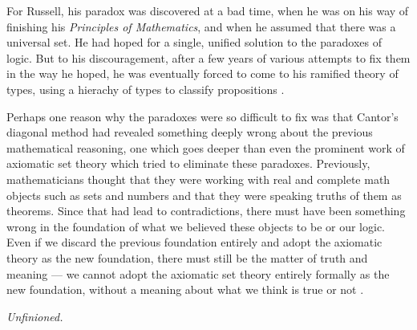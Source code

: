 \documentclass[10pt]{article}
\begin{document}
For Russell, his paradox was discovered at a bad time, when he was on his way
of finishing his \emph{Principles of Mathematics}, and when he assumed that
there was a universal set. He had hoped for a single, unified solution to the
paradoxes of logic. But to his discouragement, after a few years of various
attempts to fix them in the way he hoped, he was eventually forced to come to
his ramified theory of types, using a hierachy of types to classify
propositions \cite{companion.to.russell.tt}.

Perhaps one reason why the paradoxes were so difficult to fix was that Cantor's
diagonal method had revealed something deeply wrong about the previous
mathematical reasoning, one which goes deeper than even the prominent work of
axiomatic set theory which tried to eliminate these paradoxes. Previously,
mathematicians thought that they were working with real and complete math
objects such as sets and numbers and that they were speaking truths of them as
theorems. Since that had lead to contradictions, there must have been something
wrong in the foundation of what we believed these objects to be or our logic.
Even if we discard the previous foundation entirely and adopt the axiomatic
theory as the new foundation, there must still be the matter of truth and
meaning --- we cannot adopt the axiomatic set theory entirely formally as the
new foundation, without a meaning about what we think is true or not
\cite[Ch.~12]{kleeneitmm}.

\emph{Unfinioned.}





\end{document}
